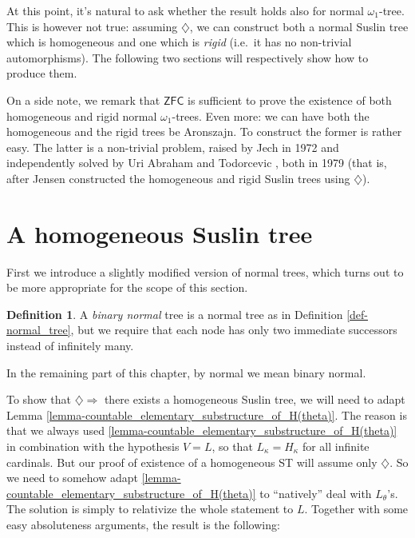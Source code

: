 \documentclass[11pt,a4paper]{report}
\theoremstyle{definition}
\newtheorem{defn}[theorem]{Definition}
\theoremstyle{num.custom-title}
\theoremstyle{custom-title}
\DeclareMathOperator{\imp}{\Rightarrow}
\newcommand{\ZFC}{\ensuremath{\mathsf{ZFC}}\xspace}
\begin{document}
At this point, it's natural to ask whether the result holds also for normal $\omega_1$-tree. This is however not true: assuming $\diamondsuit$, we can construct both a normal Suslin tree which is homogeneous and one which is \emph{rigid} (i.e.\ it has no non-trivial automorphisms). The following two sections will respectively show how to produce them.

On a side note, we remark that \ZFC is sufficient to prove the existence of both homogeneous and rigid normal $\omega_1$-trees. Even more: we can have both the homogeneous and the rigid trees be Aronszajn. To construct the former is rather easy. The latter is a non-trivial problem, raised by Jech in 1972 \cite{Jec1972} and independently solved by Uri Abraham \cite{Abr1979} and Todorcevic \cite{Tod1979}, both in 1979 (that is, after Jensen constructed the homogeneous and rigid Suslin trees using $\diamondsuit$).


\section{A homogeneous Suslin tree}

First we introduce a slightly modified version of normal trees, which turns out to be more appropriate for the scope of this section.

\begin{defn}
A \emph{binary normal} tree is a normal tree as in Definition \ref{def-normal_tree}, but we require that each node has only two immediate successors instead of infinitely many.
\end{defn}

In the remaining part of this chapter, by normal we mean binary normal.

To show that $\diamondsuit \imp$ there exists a homogeneous Suslin tree, we will need to adapt Lemma \ref{lemma-countable_elementary_substructure_of_H(theta)}. The reason is that we always used \ref{lemma-countable_elementary_substructure_of_H(theta)} in combination with the hypothesis $V=L$, so that $L_\kappa = H_\kappa$ for all infinite cardinals. But our proof of existence of a homogeneous ST will assume only $\diamondsuit$. So we need to somehow adapt \ref{lemma-countable_elementary_substructure_of_H(theta)} to ``natively'' deal with $L_\theta$'s. The solution is simply to relativize the whole statement to $L$. Together with some easy absoluteness arguments, the result is the following:
\end{document}
